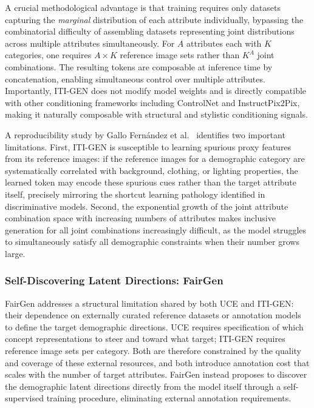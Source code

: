 A crucial methodological advantage is that training requires only 
datasets capturing the \textit{marginal} distribution of each 
attribute individually, bypassing the combinatorial difficulty of 
assembling datasets representing joint distributions across multiple 
attributes simultaneously. For $A$ attributes each with $K$ 
categories, one requires $A \times K$ reference image sets rather 
than $K^A$ joint combinations. The resulting tokens are composable 
at inference time by concatenation, enabling simultaneous control 
over multiple attributes. Importantly, ITI-GEN does not modify 
model weights and is directly compatible with other conditioning 
frameworks including ControlNet \cite{LZhang_2023_ControlNet} and 
InstructPix2Pix, making it naturally composable with structural and 
stylistic conditioning signals.

A reproducibility study by Gallo Fern\'andez et al.\ 
\cite{GalloFernandez_2024_ITIGENRepro} identifies two important 
limitations. First, ITI-GEN is susceptible to learning spurious 
proxy features from its reference images: if the reference images 
for a demographic category are systematically correlated with 
background, clothing, or lighting properties, the learned token may 
encode these spurious cues rather than the target attribute itself, 
precisely mirroring the shortcut learning pathology identified in 
discriminative models. Second, the exponential growth of the joint 
attribute combination space with increasing numbers of attributes 
makes inclusive generation for all joint combinations increasingly 
difficult, as the model struggles to simultaneously satisfy all 
demographic constraints when their number grows large.

\subsubsection*{Self-Discovering Latent Directions: FairGen}

FairGen \cite{Jiang_2025_FairGen} addresses a structural limitation 
shared by both UCE and ITI-GEN: their dependence on externally 
curated reference datasets or annotation models to define the target 
demographic directions. UCE requires specification of which concept 
representations to steer and toward what target; ITI-GEN requires 
reference image sets per category. Both are therefore constrained 
by the quality and coverage of these external resources, and both 
introduce annotation cost that scales with the number of target 
attributes. FairGen instead proposes to discover the demographic 
latent directions directly from the model itself through a 
self-supervised training procedure, eliminating external annotation 
requirements.

